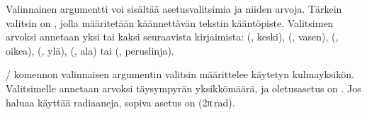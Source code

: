 \noindent
Valinnainen argumentti  voi sisältää asetusvalitsimia
ja niiden arvoja. Tärkein valitsin on , jolla määritetään
käännettävän tekstin kääntöpiste. Valitsimen arvoksi annetaan yksi tai
kaksi seuraavista kirjaimista:  (, keski),
 (, vasen),  (, oikea),
 (, ylä),  (, ala) tai
 (, peruslinja).

\begin{koodilohkosis}
\end{koodilohkosis}

\begin{tulossis}
\end{tulossis}

\noindent
{}\-/ komennon valinnaisen argumentin valitsin
 määrittelee käytetyn kulmayksikön. Valitsimelle annetaan
arvoksi täysympyrän yksikkömäärä, ja oletusasetus on . Jos haluaa käyttää radiaaneja, sopiva asetus on
 (2π\,rad).
